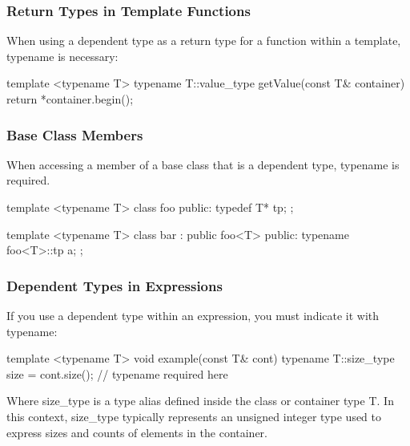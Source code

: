 \documentclass{report}
\begin{document}
     \pagebreak 
     \subsubsection{Return Types in Template Functions}
     \bigbreak \noindent 
     When using a dependent type as a return type for a function within a template, typename is necessary:
     \bigbreak \noindent 
     \begin{cppcode}
         template <typename T>
         typename T::value_type getValue(const T& container) {
             return *container.begin();
         }
     \end{cppcode}
     \bigbreak \noindent 
     \subsubsection{Base Class Members}
     \bigbreak \noindent 
     When accessing a member of a base class that is a dependent type, typename is required. 
     \bigbreak \noindent 
     \begin{cppcode}
         template <typename T>
         class foo {
         public:
             typedef T* tp;
         };

         template <typename T>
         class bar : public foo<T> {
         public:
             typename foo<T>::tp a;
         };
     \end{cppcode}

     \bigbreak \noindent 
     \subsubsection{Dependent Types in Expressions}
     \bigbreak \noindent 
     If you use a dependent type within an expression, you must indicate it with typename:
     \bigbreak \noindent 
     \begin{cppcode}
         template <typename T>
         void example(const T& cont) {
             typename T::size_type size = cont.size(); // typename required here
         }
     \end{cppcode}
     \bigbreak \noindent 
     Where size\_type is a type alias defined inside the class or container type T. In this context, size\_type typically represents an unsigned integer type used to express sizes and counts of elements in the container.

     \bigbreak \noindent 
\end{document}
